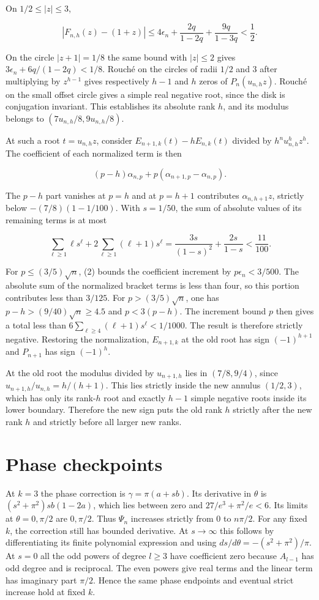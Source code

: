 \documentclass[11pt]{article}
\begin{document}
On $1/2\le|z|\le3$,

\[
|F_{n,h}(z)-(1+z)|\le4\epsilon_n+
\frac{2q}{1-2q}+\frac{9q}{1-3q}<\frac12 .
\]

On the circle $|z+1|=1/8$ the same bound with $|z|\le2$ gives $3\epsilon_n+6q/(1-2q)<1/8$. Rouché on the circles of radii $1/2$ and $3$ after multiplying by $z^{h-1}$ gives respectively $h-1$ and $h$ zeros of $P_n(u_{n,h}z)$. Rouché on the small offset circle gives a simple real negative root, since the disk is conjugation invariant. This establishes its absolute rank $h$, and its modulus belongs to $(7u_{n,h}/8,9u_{n,h}/8)$.

At such a root $t=u_{n,h}z$, consider $E_{n+1,k}(t)-hE_{n,k}(t)$ divided by $h^n u_{n,h}^h z^h$. The coefficient of each normalized term is then

\[
(p-h)\alpha_{n,p}+p(\alpha_{n+1,p}-\alpha_{n,p}).
\]

The $p-h$ part vanishes at $p=h$ and at $p=h+1$ contributes $\alpha_{n,h+1}z$, strictly below $-(7/8)(1-1/100)$. With $s=1/50$, the sum of absolute values of its remaining terms is at most

\[
\sum_{\ell\ge1}\ell s^\ell+2\sum_{\ell\ge1}(\ell+1)s^\ell
=\frac{3s}{(1-s)^2}+\frac{2s}{1-s}<\frac{11}{100}.
\]

For $p\le(3/5)\sqrt n$, (2) bounds the coefficient increment by $p\epsilon_n<3/500$. The absolute sum of the normalized bracket terms is less than four, so this portion contributes less than $3/125$. For $p>(3/5)\sqrt n$, one has $p-h>(9/40)\sqrt n\ge4.5$ and $p<3(p-h)$. The increment bound $p$ then gives a total less than $6\sum_{\ell\ge4}(\ell+1)s^\ell<1/1000$. The result is therefore strictly negative. Restoring the normalization, $E_{n+1,k}$ at the old root has sign $(-1)^{h+1}$ and $P_{n+1}$ has sign $(-1)^h$.

At the old root the modulus divided by $u_{n+1,h}$ lies in $(7/8,9/4)$, since $u_{n+1,h}/u_{n,h}=h/(h+1)$. This lies strictly inside the new annulus $(1/2,3)$, which has only its rank-$h$ root and exactly $h-1$ simple negative roots inside its lower boundary. Therefore the new sign puts the old rank $h$ strictly after the new rank $h$ and strictly before all larger new ranks.


\section{Phase checkpoints}

At $k=3$ the phase correction is $\gamma=\pi(a+s b)$. Its derivative in $\theta$ is $(s^2+\pi^2)s b(1-2a)$, which lies between zero and $27/e^3+\pi^2/e<6$. Its limits at $\theta=0,\pi/2$ are $0,\pi/2$. Thus $\Psi_n$ increases strictly from 0 to $n\pi/2$. For any fixed $k$, the correction still has bounded derivative. At $s\to\infty$ this follows by differentiating its finite polynomial expression and using $ds/d\theta=-(s^2+\pi^2)/\pi$. At $s=0$ all the odd powers of degree $l\ge3$ have coefficient zero because $A_{l-1}$ has odd degree and is reciprocal. The even powers give real terms and the linear term has imaginary part $\pi/2$. Hence the same phase endpoints and eventual strict increase hold at fixed $k$.
\end{document}
